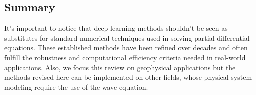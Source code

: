 \documentclass[11pt,twoside]{article}
\begin{document}
\subsection{Summary}

It's important to notice that deep learning methods shouldn't be seen as substitutes for standard numerical techniques used in solving partial differential equations. These established methods have been refined over decades and often fulfill the robustness and computational efficiency criteria needed in real-world applications. Also, we focus this review on geophysical applications but the methods revised here can be implemented on other fields, whose physical system modeling require the use of the wave equation. 



\end{document}
